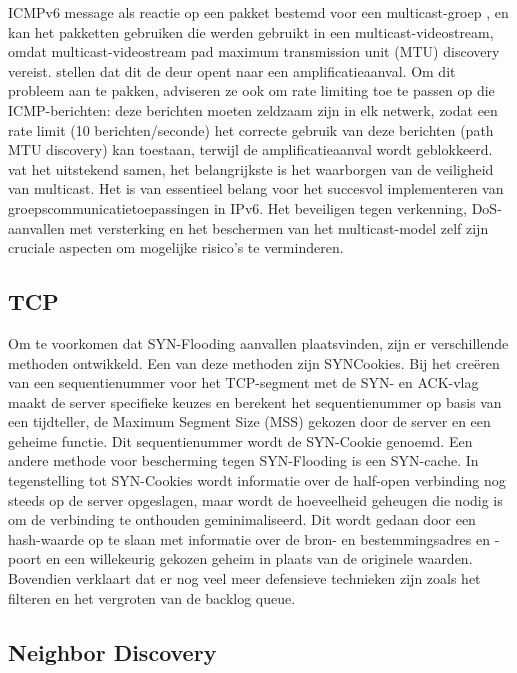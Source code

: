 ICMPv6 message als reactie op een pakket bestemd voor een multicast-groep \autocite{vyncke2009ipv6}, en kan het pakketten gebruiken die werden gebruikt in een multicast-videostream, omdat multicast-videostream pad maximum transmission unit (MTU) discovery vereist. \textcite{vyncke2009ipv6} stellen dat dit de deur opent naar een amplificatieaanval. Om dit probleem aan te pakken, adviseren ze ook om rate limiting toe te passen op die ICMP-berichten: deze berichten moeten zeldzaam zijn in elk netwerk, zodat een rate limit (10 berichten/seconde) het correcte gebruik van deze berichten (path MTU discovery) kan toestaan, terwijl de amplificatieaanval wordt geblokkeerd. \textcite{6726061} vat het uitstekend samen, het belangrijkste is het waarborgen van de veiligheid van multicast. Het is van essentieel belang voor het succesvol implementeren van groepscommunicatietoepassingen in IPv6. Het beveiligen tegen verkenning, DoS-aanvallen met versterking en het beschermen van het multicast-model zelf zijn cruciale aspecten om mogelijke risico's te verminderen.

\subsection{TCP}
Om te voorkomen dat SYN-Flooding aanvallen plaatsvinden, zijn er verschillende methoden ontwikkeld. \autocite{morbitzer2013tcp} Een van deze methoden zijn SYNCookies. Bij het creëren van een sequentienummer voor het TCP-segment met de SYN- en ACK-vlag maakt de server specifieke keuzes en berekent het sequentienummer op basis van een tijdteller, de Maximum Segment Size (MSS) gekozen door de server en een geheime functie. Dit sequentienummer wordt de SYN-Cookie genoemd.
Een andere methode voor bescherming tegen SYN-Flooding is een SYN-cache. In tegenstelling tot SYN-Cookies wordt informatie over de half-open verbinding nog steeds op de server opgeslagen, maar wordt de hoeveelheid geheugen die nodig is om de verbinding te onthouden geminimaliseerd. Dit wordt gedaan door een hash-waarde op te slaan met informatie over de bron- en bestemmingsadres en -poort en een willekeurig gekozen geheim in plaats van de originele waarden. 
Bovendien verklaart \textcite{morbitzer2013tcp} dat er nog veel meer defensieve technieken zijn zoals het filteren en het vergroten van de backlog queue.


\subsection{Neighbor Discovery}

